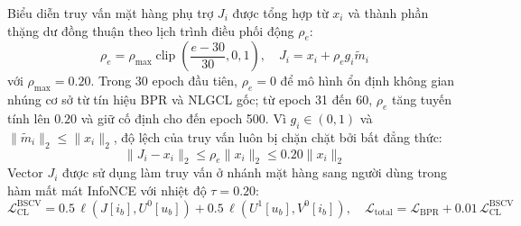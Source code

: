 Biểu diễn truy vấn mặt hàng phụ trợ $J_i$ được tổng hợp từ $x_i$ và thành phần thặng dư đồng thuận theo lịch trình điều phối động $\rho_e$:
\begin{equation}
\rho_e = \rho_{\max} \operatorname{clip}\left(\frac{e - 30}{30}, 0, 1\right), \quad J_i = x_i + \rho_e g_i \tilde{m}_i
\end{equation}
với $\rho_{\max} = 0.20$. Trong 30 epoch đầu tiên, $\rho_e = 0$ để mô hình ổn định không gian nhúng cơ sở từ tín hiệu BPR và NLGCL gốc; từ epoch 31 đến 60, $\rho_e$ tăng tuyến tính lên $0.20$ và giữ cố định cho đến epoch 500. Vì $g_i \in (0, 1)$ và $\|\tilde{m}_i\|_2 \le \|x_i\|_2$, độ lệch của truy vấn luôn bị chặn chặt bởi bất đẳng thức:
\begin{equation}
\|J_i - x_i\|_2 \le \rho_e \|x_i\|_2 \le 0.20 \|x_i\|_2
\end{equation}
Vector $J_i$ được sử dụng làm truy vấn ở nhánh mặt hàng sang người dùng trong hàm mất mát InfoNCE với nhiệt độ $\tau = 0.20$:
\begin{equation}
\mathcal{L}_{\text{CL}}^{\text{BSCV}} = 0.5\,\ell(J[i_b], U^0[u_b]) + 0.5\,\ell(U^1[u_b], V^0[i_b]), \quad \mathcal{L}_{\text{total}} = \mathcal{L}_{\text{BPR}} + 0.01\,\mathcal{L}_{\text{CL}}^{\text{BSCV}}
\end{equation}

